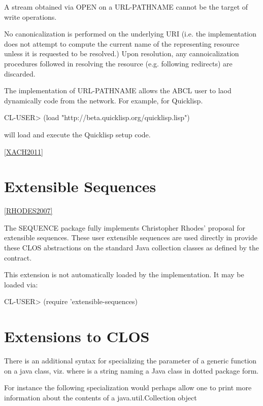 \documentclass[10pt]{book}
\begin{document}
A stream obtained via OPEN on a URL-PATHNAME cannot be the target of
write operations.

No canonicalization is performed on the underlying URI (i.e. the
implementation does not attempt to compute the current name of the
representing resource unless it is requested to be resolved.)  Upon
resolution, any cannoicalization procedures followed in resolving the
resource (e.g. following redirects) are discarded.  

The implementation of URL-PATHNAME allows the ABCL user to laod dynamically
code from the network.  For example, for Quicklisp.

\begin{listing-lisp}
  CL-USER> (load "http://beta.quicklisp.org/quicklisp.lisp")
\end{listing-lisp}

will load and execute the Quicklisp setup code.

\ref{XACH2011}
         
\section{Extensible Sequences}

\ref{RHODES2007}

The SEQUENCE package fully implements Christopher Rhodes' proposal for
extensible sequences.  These user extensible sequences are used
directly in  provide these CLOS
abstractions on the standard Java collection classes as defined by the
 contract.

This extension is not automatically loaded by the implementation.   It
may be loaded via:

\begin{listing-lisp}
CL-USER> (require 'extensible-sequences)
\end{listing-lisp}

\section{Extensions to CLOS}

There is an additional syntax for specializing the parameter of a
generic function on a java class, viz. 
where  is a string naming a Java class in dotted package
form.

For instance the following specialization would perhaps allow one to
print more information about the contents of a java.util.Collection
object
\end{document}
